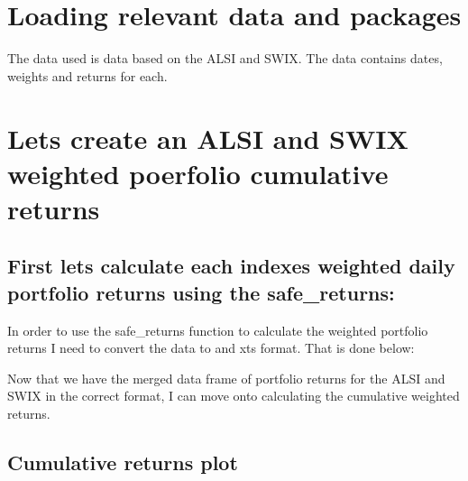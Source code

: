 \documentclass[11pt,preprint, authoryear]{elsarticle}
\numberwithin{equation}{section}
\numberwithin{figure}{section}
\numberwithin{table}{section}
\begin{document}
\hypertarget{loading-relevant-data-and-packages}{%
\section{Loading relevant data and
packages}\label{loading-relevant-data-and-packages}}

The data used is data based on the ALSI and SWIX. The data contains
dates, weights and returns for each.

\hypertarget{lets-create-an-alsi-and-swix-weighted-poerfolio-cumulative-returns}{%
\section{Lets create an ALSI and SWIX weighted poerfolio cumulative
returns}\label{lets-create-an-alsi-and-swix-weighted-poerfolio-cumulative-returns}}

\hypertarget{first-lets-calculate-each-indexes-weighted-daily-portfolio-returns-using-the-safe_returns}{%
\subsection{First lets calculate each indexes weighted daily portfolio
returns using the
safe\_returns:}\label{first-lets-calculate-each-indexes-weighted-daily-portfolio-returns-using-the-safe_returns}}

In order to use the safe\_returns function to calculate the weighted
portfolio returns I need to convert the data to and xts format. That is
done below:

Now that we have the merged data frame of portfolio returns for the ALSI
and SWIX in the correct format, I can move onto calculating the
cumulative weighted returns.

\hypertarget{cumulative-returns-plot}{%
\subsection{Cumulative returns plot}\label{cumulative-returns-plot}}
\end{document}
